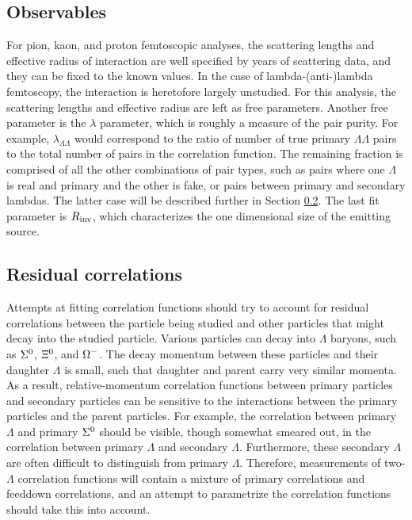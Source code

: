\subsection{Observables}
\label{sec:Observables}
For pion, kaon, and proton femtoscopic analyses, the scattering lengths and effective radius of interaction are well specified by years of scattering data, and they can be fixed to the known values.  In the case of lambda-(anti-)lambda femtoscopy, the interaction is heretofore largely unstudied.  For this analysis, the scattering lengths and effective radius are left as free parameters.  Another free parameter is the $\lambda$ parameter, which is roughly a measure of the pair purity.  For example, $\lambda_{\Lambda\Lambda}$ would correspond to the ratio of number of true primary $\Lambda\Lambda$ pairs to the total number of pairs in the correlation function. The remaining fraction is comprised of all the other combinations of pair types, such as pairs where one $\Lambda$ is real and primary and the other is fake, or pairs between primary and secondary lambdas.  The latter case will be described further in Section \ref{sec:Residual}.  The last fit parameter is $R_{\rm inv}$, which characterizes the one dimensional size of the emitting source.  


\subsection{Residual correlations}
\label{sec:Residual}

Attempts at fitting correlation functions should try to account for residual correlations between the particle being studied and other particles that might decay into the studied particle.  Various particles can decay into $\Lambda$ baryons, such as $\Sigma^{\rm 0}$, $\Xi^{\rm 0}$, and $\Omega^{\rm -}$.  The decay momentum between these particles and their daughter $\Lambda$ is small, such that daughter and parent carry very similar momenta.  As a result, relative-momentum correlation functions between primary particles and secondary particles can be sensitive to the interactions between the primary particles and the parent particles.  For example, the correlation between primary $\Lambda$ and primary $\Sigma^{\rm 0}$ should be visible, though somewhat smeared out, in the correlation between primary $\Lambda$ and secondary $\Lambda$.  Furthermore, these secondary $\Lambda$ are often difficult to distinguish from primary $\Lambda$.  Therefore, measurements of two-$\Lambda$ correlation functions will contain a mixture of primary correlations and feeddown correlations, and an attempt to parametrize the correlation functions should take this into account.  

